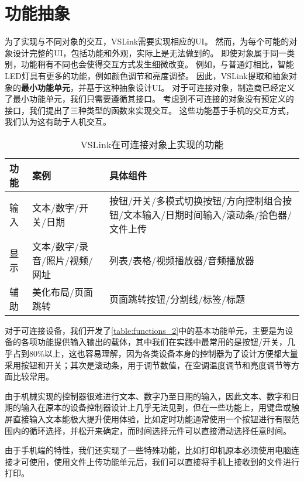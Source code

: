 \section{功能抽象}
为了实现与不同对象的交互，VSLink需要实现相应的UI。
然而，为每个可能的对象设计完整的UI，包括功能和外观，实际上是无法做到的。
即使对象属于同一类别，功能稍有不同也会使得交互方式发生细微改变。
例如，与普通灯相比，智能LED灯具有更多的功能，例如颜色调节和亮度调整。
因此，VSLink提取和抽象对象的\textbf{最小功能单元}，并基于这种抽象设计UI。
对于可连接对象，制造商已经定义了最小功能单元，我们只需要遵循其接口。
考虑到不可连接的对象没有预定义的接口，我们提出了三种类型的函数来实现交互。
这些功能基于手机的交互方式，我们认为这有助于人机交互。

\begin{table}[htb]
	\caption{VSLink在可连接对象上实现的功能}  \label{table:functions_2} 
	\begin{center}  
		\begin{tabular}{|m{1cm}<{\centering}|m{6cm}<{\centering}|m{8cm}<{\centering}|}  
			\hline  
			\textbf{功能} & \textbf{案例} &\textbf{具体组件}\\ \hline  
			输入 & 文本/数字/开关/日期 & 按钮/开关/多模式切换按钮/方向控制组合按钮/文本输入/日期时间输入/滚动条/拾色器/文件上传 \\ \hline 
			显示 & 文本/数字/录音/照片/视频/网址 & 列表/表格/视频播放器/音频播放器  \\ \hline
			辅助 & 美化布局/页面跳转 & 页面跳转按钮/分割线/标签/标题 \\ \hline
		\end{tabular}  
	\end{center}  
\end{table}

对于可连接设备，我们开发了\autoref{table:functions_2}中的基本功能单元，主要是为设备的各项功能提供输入输出的载体，其中我们在实践中最常用的是按钮/开关，几乎占到80\%以上，这也容易理解，因为各类设备本身的控制器为了设计方便都大量采用按钮和开关；其次是滚动条，用于调节数值，在空调温度调节和亮度调节等方面比较常用。

由于机械实现的控制器很难进行文本、数字乃至日期的输入，因此文本、数字和日期的输入在原本的设备控制器设计上几乎无法见到，但在一些功能上，用键盘或触屏直接输入文本能极大提升使用体验，比如定时功能通常使用一个按钮进行有限范围内的循环选择，并松开来确定，而时间选择元件可以直接滑动选择任意时间。

由于手机端的特性，我们还实现了一些特殊功能，比如打印机原本必须使用电脑连接才可使用，使用文件上传功能单元后，我们可以直接将手机上接收到的文件进行打印。

